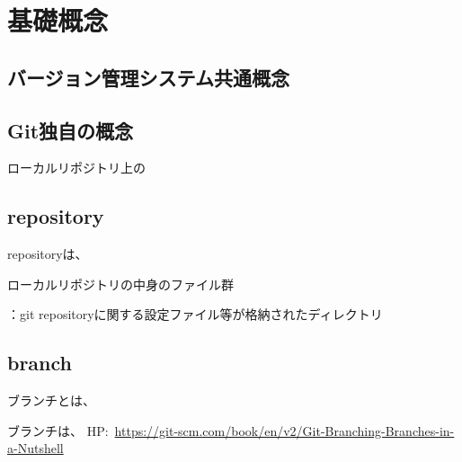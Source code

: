 \documentclass[11pt,a4paper,openany,dvipdfmx]{jsarticle}
\begin{document}
\section{基礎概念} %
\label{sec:基礎概念}


\subsection{バージョン管理システム共通概念} %
\label{sub:バージョン管理システム共通概念}



\subsection{Git独自の概念} %
\label{sub:git独自の概念}

ローカルリポジトリ上の


\subsection{repository} %
\label{sub:repository}


\begin{tcolorbox}[
title=repositoryについて, fonttitle=\bfseries]
repositoryは、
\end{tcolorbox}

ローカルリポジトリの中身のファイル群
\begin{blueitemize}
  \item \textcolor{Red}{}：git repositoryに関する設定ファイル等が格納されたディレクトリ
  \item {}
  \item {}
\end{blueitemize}


\subsection{branch} %
\label{sub:branch}
ブランチとは、

\begin{tcolorbox}[
title=branchについて, fonttitle=\bfseries]
ブランチは、
\tcblower
HP:\ \url{https://git-scm.com/book/en/v2/Git-Branching-Branches-in-a-Nutshell}
\end{tcolorbox}
\end{document}
